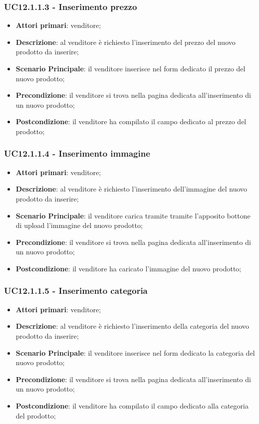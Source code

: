 \subsubsection{UC12.1.1.3 - Inserimento prezzo}
\begin{itemize}
\item \textbf{Attori primari}: venditore;
\item \textbf{Descrizione}: al venditore è richiesto l'inserimento del prezzo del nuovo prodotto da inserire;
\item \textbf{Scenario Principale}: il venditore inserisce nel form dedicato il prezzo del nuovo prodotto;
\item \textbf{Precondizione}: il venditore si trova nella pagina dedicata all'inserimento di un nuovo prodotto;
\item \textbf{Postcondizione}: il venditore ha compilato il campo dedicato al prezzo del prodotto;
\end{itemize}

\subsubsection{UC12.1.1.4 - Inserimento immagine}
\begin{itemize}
\item \textbf{Attori primari}: venditore;
\item \textbf{Descrizione}: al venditore è richiesto l'inserimento dell'immagine del nuovo prodotto da inserire;
\item \textbf{Scenario Principale}: il venditore carica tramite tramite l'apposito bottone di upload l'immagine del nuovo prodotto;
\item \textbf{Precondizione}: il venditore si trova nella pagina dedicata all'inserimento di un nuovo prodotto;
\item \textbf{Postcondizione}: il venditore ha caricato l'immagine del nuovo prodotto;
\end{itemize}

\subsubsection{UC12.1.1.5 - Inserimento categoria}
\begin{itemize}
\item \textbf{Attori primari}: venditore;
\item \textbf{Descrizione}: al venditore è richiesto l'inserimento della categoria del nuovo prodotto da inserire;
\item \textbf{Scenario Principale}: il venditore inserisce nel form dedicato la categoria del nuovo prodotto;
\item \textbf{Precondizione}: il venditore si trova nella pagina dedicata all'inserimento di un nuovo prodotto;
\item \textbf{Postcondizione}: il venditore ha compilato il campo dedicato alla categoria del prodotto;
\end{itemize}

